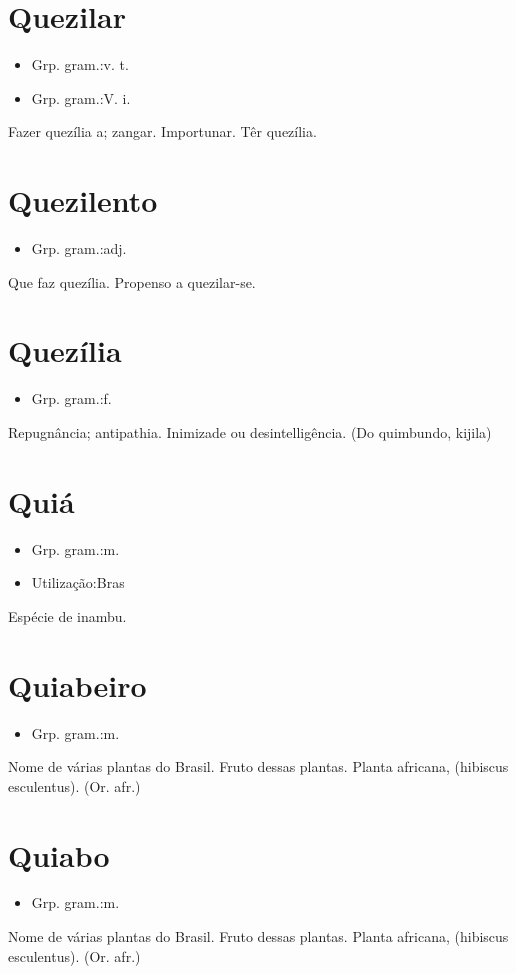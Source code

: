 \section{Quezilar}
\begin{itemize}
\item {Grp. gram.:v. t.}
\end{itemize}
\begin{itemize}
\item {Grp. gram.:V. i.}
\end{itemize}
Fazer quezília a; zangar.
Importunar.
Têr quezília.
\section{Quezilento}
\begin{itemize}
\item {Grp. gram.:adj.}
\end{itemize}
Que faz quezília.
Propenso a quezilar-se.
\section{Quezília}
\begin{itemize}
\item {Grp. gram.:f.}
\end{itemize}
Repugnância; antipathia.
Inimizade ou desintelligência.
(Do quimbundo, \textunderscore kijila\textunderscore )
\section{Quiá}
\begin{itemize}
\item {Grp. gram.:m.}
\end{itemize}
\begin{itemize}
\item {Utilização:Bras}
\end{itemize}
Espécie de inambu.
\section{Quiabeiro}
\begin{itemize}
\item {Grp. gram.:m.}
\end{itemize}
Nome de várias plantas do Brasil.
Fruto dessas plantas.
Planta africana, (\textunderscore hibiscus esculentus\textunderscore ).
(Or. afr.)
\section{Quiabo}
\begin{itemize}
\item {Grp. gram.:m.}
\end{itemize}
Nome de várias plantas do Brasil.
Fruto dessas plantas.
Planta africana, (\textunderscore hibiscus esculentus\textunderscore ).
(Or. afr.)
